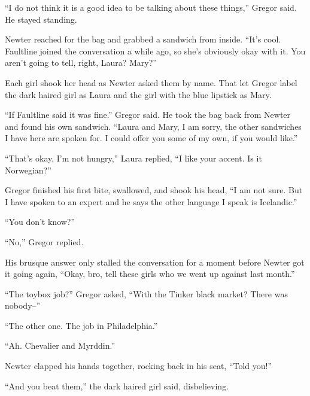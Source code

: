 ``I do not think it is a good idea to be talking about these things,'' Gregor said.  He stayed standing.



Newter reached for the bag and grabbed a sandwich from inside.  ``It's cool.  Faultline joined the conversation a while ago, so she's obviously okay with it.  You aren't going to tell, right, Laura?  Mary?''



Each girl shook her head as Newter asked them by name.  That let Gregor label the dark haired girl as Laura and the girl with the blue lipstick as Mary.



``If Faultline said it was fine.'' Gregor said.  He took the bag back from Newter and found his own sandwich.  ``Laura and Mary, I am sorry, the other sandwiches I have here are spoken for.  I could offer you some of my own, if you would like.''



``That's okay, I'm not hungry,'' Laura replied, ``I like your accent.  Is it Norwegian?''



Gregor finished his first bite, swallowed, and shook his head, ``I am not sure.   But I have spoken to an expert and he says the other language I speak is Icelandic.''



``You don't know?''



``No,'' Gregor replied.



His brusque answer only stalled the conversation for a moment before Newter got it going again, ``Okay, bro, tell these girls who we went up against last month.''



``The toybox job?'' Gregor asked, ``With the Tinker black market?  There was nobody--''



``The other one.  The job in Philadelphia.''



``Ah.  Chevalier and Myrddin.''



Newter clapped his hands together, rocking back in his seat, ``Told you!''



``And you beat them,'' the dark haired girl said, disbelieving.



